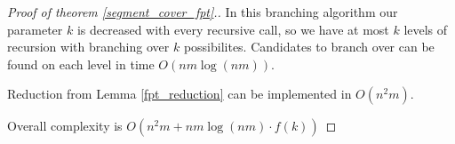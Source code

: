 \begin{proof}[Proof of theorem \ref{segment_cover_fpt}.]
In this branching algorithm our parameter $k$ is decreased with every
recursive call, so we have at most $k$ levels of recursion with
branching over $k$ possibilites. Candidates to branch over
can be found on each level in time $O(nm \log(nm))$.

Reduction from Lemma \ref{fpt_reduction} can be implemented in $O(n^2m)$.

Overall complexity is $O(n^2m + nm \log(nm) \cdot f(k))$

\end{proof}


